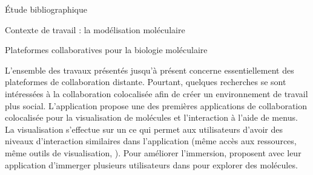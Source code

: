 \documentclass[myfrancais,ngerman,english,french]{mythesis}
\begin{document}
\begin{mychapter}{Étude bibliographique}
\begin{mysection}{Contexte de travail : la modélisation moléculaire}
\begin{mysubsection}{Plateformes collaboratives pour la biologie moléculaire}
				\begin{myfigure}
				\end{myfigure}

				L'ensemble des travaux présentés jusqu'à présent concerne essentiellement des plateformes de collaboration distante.
				Pourtant, quelques recherches se sont intéressées à la collaboration colocalisée afin de créer un environnement de travail plus social.
				L'application \myPaulingWorld {} propose une des premières applications de collaboration colocalisée pour la visualisation de molécules et l'interaction à l'aide de menus.
				La visualisation s'effectue sur un \myWorkbench ce qui permet aux utilisateurs d'avoir des niveaux d'interaction similaires dans l'application (même accès aux ressources, même outils de visualisation, \myetc).
				Pour améliorer l'immersion,  proposent avec leur application \myDIVERSE d'immerger plusieurs utilisateurs dans \myCAVE pour explorer des molécules.


\end{mysubsection}
\end{mysection}
\end{mychapter}
\end{document}
